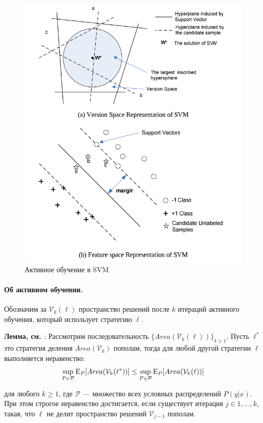 \documentclass[specialist, 12pt, href]{article}
\begin{document}
\begin{figure}[htbp]
\centering
\includegraphics[width=5in]{img/svm+al.png}
\caption{Активное обучение в SVM}
\end{figure}

\paragraph{Об активном
обучении.}

Обозначим за \(\mathcal{V}_k(\ell)\) пространство решений после \(k\) итераций активного обучения,
который использует стратегию \(\ell\).

\textbf{Лемма, см. \cite{TongKoller}}:
Рассмотрим последовательность \(\{Area(\mathcal{V}_k(\ell))\}_{k \geq 1}\).
Пусть  \(\ell^*\) это стратегия деления \(Area(\mathcal{V}_k)\)
пополам, тогда для любой другой стратегии
\(\ell\) выполняется неравенство:
\[\sup_{P \in \mathcal{P}} {\rm E}_P[Area(\mathcal{V}_k(\ell^*))] \leq \sup_{P \in \mathcal{P}} {\rm E}_P[Area(\mathcal{V}_k(\ell))]\]

для любого \(k \geq 1\), где \(\mathcal{P}\) --- множество всех условных
распределений \(P(y|x)\). При этом строгое неравенство достигается, если
существует итерация \(j \in 1,\ldots, k\), такая, что \(\ell\) не делит
пространство решений \(\mathcal{V}_{j - 1}\) пополам.
\end{document}
